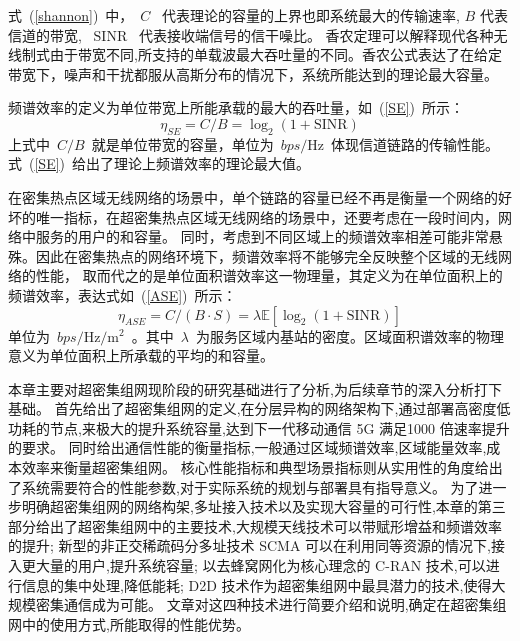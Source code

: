 式~(\ref{shannon})~中，~$C$~ 代表理论的容量的上界也即系统最大的传输速率, $B$ 代表信道的带宽, ~$\mathrm{SINR}$~ 代表接收端信号的信干噪比。
香农定理可以解释现代各种无线制式由于带宽不同,所支持的单载波最大吞吐量的不同。香农公式表达了在给定带宽下，噪声和干扰都服从高斯分布的情况下，系统所能达到的理论最大容量。

频谱效率的定义为单位带宽上所能承载的最大的吞吐量，如~(\ref{SE})~所示：
\begin{equation}\label{SE}
\eta_{SE}=C/B=\log_2(1+\mathrm{SINR})
\end{equation}
上式中~$C/B$~就是单位带宽的容量，单位为~$bps/\mathrm{Hz}$~体现信道链路的传输性能。式~(\ref{SE})~给出了理论上频谱效率的理论最大值。

在密集热点区域无线网络的场景中，单个链路的容量已经不再是衡量一个网络的好坏的唯一指标，在超密集热点区域无线网络的场景中，还要考虑在一段时间内，网络中服务的用户的和容量。
同时，考虑到不同区域上的频谱效率相差可能非常悬殊。因此在密集热点的网络环境下，频谱效率将不能够完全反映整个区域的无线网络的性能，
取而代之的是单位面积谱效率这一物理量，其定义为在单位面积上的频谱效率，表达式如~(\ref{ASE})~所示：
\begin{equation}\label{ASE}
  \eta_{ASE}=C/(B\cdot S) = \lambda\mathbb{E}[\log_2(1+\mathrm{SINR})]
\end{equation}
单位为~$bps/\mathrm{Hz}/\mathrm{m}^2$~。其中~$\lambda$~为服务区域内基站的密度。区域面积谱效率的物理意义为单位面积上所承载的平均的和容量。

本章主要对超密集组网现阶段的研究基础进行了分析,为后续章节的深入分析打下基础。
首先给出了超密集组网的定义,在分层异构的网络架构下,通过部署高密度低功耗的节点,来极大的提升系统容量,达到下一代移动通信 5G 满足1000 倍速率提升的要求。
同时给出通信性能的衡量指标,一般通过区域频谱效率,区域能量效率,成本效率来衡量超密集组网。
核心性能指标和典型场景指标则从实用性的角度给出了系统需要符合的性能参数,对于实际系统的规划与部署具有指导意义。
为了进一步明确超密集组网的网络构架,多址接入技术以及实现大容量的可行性,本章的第三部分给出了超密集组网中的主要技术,大规模天线技术可以带赋形增益和频谱效率的提升;
新型的非正交稀疏码分多址技术 SCMA 可以在利用同等资源的情况下,接入更大量的用户,提升系统容量;
以去蜂窝网化为核心理念的 C-RAN 技术,可以进行信息的集中处理,降低能耗;
D2D 技术作为超密集组网中最具潜力的技术,使得大规模密集通信成为可能。
文章对这四种技术进行简要介绍和说明,确定在超密集组网中的使用方式,所能取得的性能优势。
